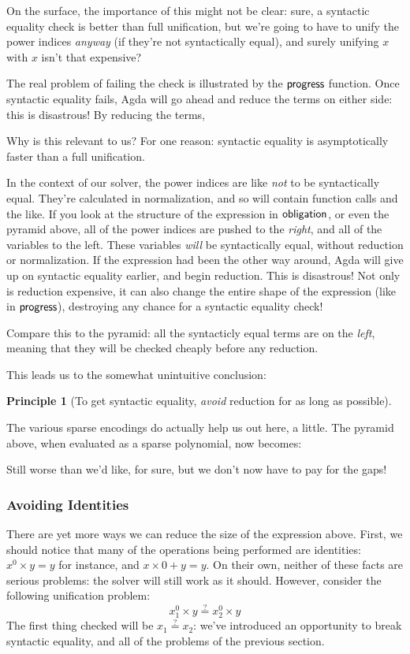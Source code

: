\documentclass[draft, twocolumn]{article}
\theoremstyle{definition}
\theoremstyle{definition}
\newtheorem{principle}{Principle}[section]
\begin{document}
On the surface, the importance of this might not be clear: sure, a syntactic
equality check is better than full unification, but we're going to have to unify
the power indices \emph{anyway} (if they're not syntactically equal), and surely
unifying \(x\) with \(x\) isn't that expensive?

The real problem of failing the check is illustrated by the
\(\AgdaFunction{progress}\) function. Once syntactic equality fails, Agda will
go ahead and reduce the terms on either side: this is disastrous! By reducing
the terms, 


Why is this relevant to us? For one reason: syntactic equality is
asymptotically faster than a full unification.

In the context of our solver, the power indices are like \emph{not} to be
syntactically equal. They're calculated in normalization, and so will contain
function calls and the like. If you look at the structure of the expression in
\(\AgdaFunction{obligation}\), or even the pyramid above, all of the power
indices are pushed to the \emph{right}, and all of the variables to the left.
These variables \emph{will} be syntactically equal, without reduction or
normalization. If the expression had been the other way around, Agda will give
up on syntactic equality earlier, and begin reduction. This is disastrous! Not
only is reduction expensive, it can also change the entire shape of the
expression (like in \(\AgdaFunction{progress}\)), destroying any chance for a
syntactic equality check!

Compare this to the pyramid: all the syntacticly equal terms are on the
\emph{left}, meaning that they will be checked cheaply before any reduction.

This leads us to the somewhat unintuitive conclusion:
\begin{principle}[To get syntactic equality, \emph{avoid} reduction for as long
  as possible]
\end{principle}
The various sparse encodings do actually help us out here, a little. The pyramid
above, when evaluated as a sparse polynomial, now becomes:
\begin{center}
\end{center}
Still worse than we'd like, for sure, but we don't now have to pay for the gaps!
\subsubsection{Avoiding Identities}
There are yet more ways we can reduce the size of the expression above. First,
we should notice that many of the operations being performed are identities:
\(x^0 \times y = y\) for instance, and \(x \times 0 + y = y\). On their own,
neither of these facts are serious problems: the solver will still work as it
should. However, consider the following unification problem:
\[x_1^0 \times y \stackrel{?}{=} x_2^0 \times y\]
The first thing checked will be \(x_1 \stackrel{?}{=} x_2\): we've introduced an
opportunity to break syntactic equality, and all of the problems of the previous
section.
\end{document}

